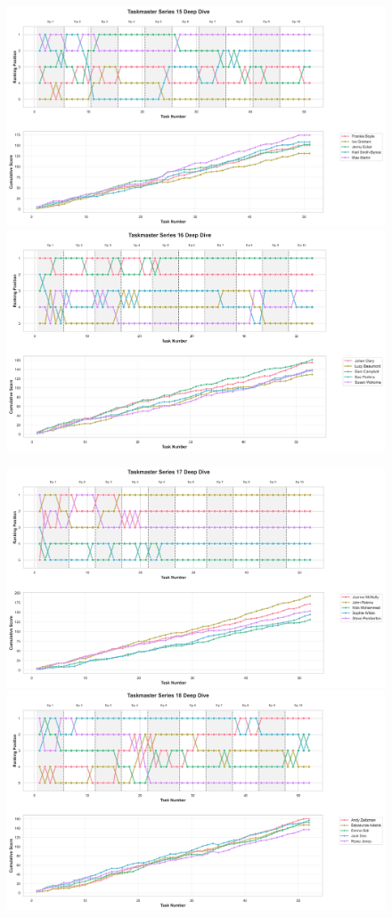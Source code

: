 \documentclass[10pt,letterpaper]{article}
\begin{document}
\begin{figure}[!h]
\centering
\includegraphics[width=\linewidth]{supfigure/series_15_deep_dive.png}
\includegraphics[width=\linewidth]{supfigure/series_16_deep_dive.png}
\end{figure}
\FloatBarrier
\clearpage

\begin{figure}[!h]
\centering
\includegraphics[width=\linewidth]{supfigure/series_17_deep_dive.png}
\includegraphics[width=\linewidth]{supfigure/series_18_deep_dive.png}
\end{figure}
\FloatBarrier
\clearpage
\end{document}
